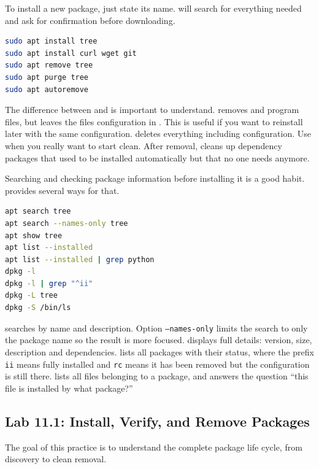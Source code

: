 To install a new package, just state its name.  will search for everything needed and ask for confirmation before downloading.

\begin{lstlisting}[language=bash, caption={Package installation and removal}]
sudo apt install tree
sudo apt install curl wget git
sudo apt remove tree
sudo apt purge tree
sudo apt autoremove
\end{lstlisting}

The difference between  and  is important to understand.
 removes  and program files, but leaves the files
configuration in . This is useful if you want to reinstall later with the same configuration.  deletes everything including configuration. Use  when you really want to start clean. After removal,  cleans up dependency packages that used to be installed automatically but that no one needs anymore.

Searching and checking package information before installing it is a good habit.  provides several ways for that.

\begin{lstlisting}[language=bash, caption={Search and check package information}]
apt search tree
apt search --names-only tree
apt show tree
apt list --installed
apt list --installed | grep python
dpkg -l
dpkg -l | grep "^ii"
dpkg -L tree
dpkg -S /bin/ls
\end{lstlisting}

 searches by name and description. Option
\texttt{--names-only} limits the search to only the package name so
the result is more focused.  displays full details: version, size, description and dependencies.  lists all packages with their status, where the prefix \texttt{ii} means fully installed and \texttt{rc} means it has been removed but the configuration is still there.  lists all files belonging to a package, and  answers the question ``this file is installed by what package?''

\subsection*{Lab 11.1: Install, Verify, and Remove Packages}

The goal of this practice is to understand the complete package life cycle, from discovery to clean removal.

